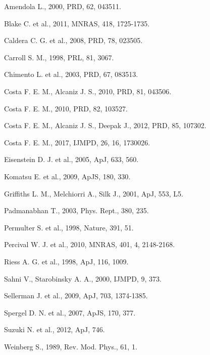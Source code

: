 \documentclass[twocolumn,preprintnumbers,amsmath,amssymb]{revtex4}
\begin{document}
\begin{thebibliography}{99}

 Amendola L., 2000, PRD, 62, 043511.

 Blake C. et al., 2011, MNRAS, 418, 1725-1735.

 Caldera C. G. et al., 2008, PRD, 78, 023505.

 Carroll S. M., 1998, PRL, 81, 3067.

 Chimento L. et al., 2003, PRD, 67, 083513.

 Costa F. E. M., Alcaniz J. S., 2010, PRD, 81, 043506.

 Costa F. E. M., 2010, PRD, 82, 103527. 
 
 Costa F. E. M., Alcaniz J. S., Deepak J., 2012, PRD, 85, 107302.

 Costa F. E. M., 2017, IJMPD, 26, 16, 1730026. 

 Eisenstein D. J. et al., 2005, ApJ, 633, 560.

 Komatsu E. et al., 2009, ApJS, 180, 330.

 Griffiths L. M., Melchiorri A., Silk J., 2001, ApJ, 553, L5.

 Padmanabhan T., 2003, Phys. Rept., 380, 235.

 Permulter S. et al., 1998, Nature, 391, 51.

 Percival W. J. et al., 2010, MNRAS, 401, 4, 2148-2168.

 Riess A. G. et al., 1998, ApJ, 116, 1009.

 Sahni V., Starobinsky A. A., 2000, IJMPD, 9, 373.

 Sellerman J. et al., 2009, ApJ, 703, 1374-1385.

 Spergel D. N. et al., 2007, ApJS, 170, 377.

 Suzuki N. et al., 2012, ApJ, 746.

 Weinberg S., 1989, Rev. Mod. Phys., 61, 1. 

\end{thebibliography}

\label{lastpage}
\end{document}
